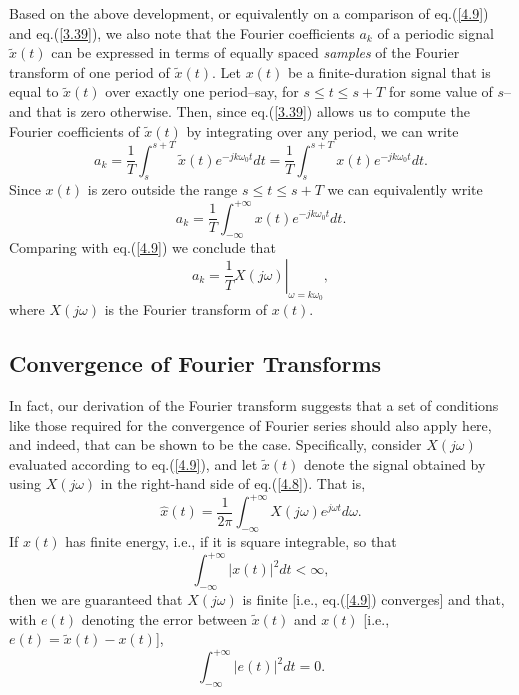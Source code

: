 \documentclass[a4paper,twoside]{book}
\begin{document}
Based on the above development, or equivalently on a comparison of eq.\;(\ref{4.9}) and eq.\;(\ref{3.39}), we also note that the Fourier coefficients $a_k$ of a periodic signal $\tilde{x}(t)$ can be expressed in terms of equally spaced \textit{samples} of the Fourier transform of one period of $\tilde{x}(t)$. Let $x(t)$ be a finite-duration signal that is equal to $\tilde{x}(t)$ over exactly one period--say, for $s\le t\le s+T$ for some value of $s$--and that is zero otherwise. Then, since eq.\;(\ref{3.39}) allows us to compute the Fourier coefficients of $\tilde{x}(t)$ by integrating over any period, we can write $$a_k = \frac1T\int_s^{s+T}\tilde{x}(t)e^{-jk\omega_0t}dt = \frac1T\int_s^{s+T}x(t)e^{-jk\omega_0t}dt.$$ Since $x(t)$ is zero outside the range $s\le t\le s+T$ we can equivalently write $$a_{k} = \frac{1}{T}\int_{-\infty}^{+\infty}x(t)e^{-jk\omega_{0}t}dt.$$ Comparing with eq.\;(\ref{4.9}) we conclude that
\begin{equation}
    a_k=\left.\frac1TX(j\omega)\right|_{\omega=k\omega_0},
    \label{4.10}
\end{equation}
where $X(j\omega)$ is the Fourier transform of $x(t)$.

\subsection{Convergence of Fourier Transforms}
\label{section:4.1.2}

In fact, our derivation of the Fourier transform suggests that a set of conditions like those required for the convergence of Fourier series should also apply here, and indeed, that can be shown to be the case. Specifically, consider $X(j\omega)$ evaluated according to eq.\;(\ref{4.9}), and let $\tilde{x}(t)$ denote the signal obtained by using $X(j\omega)$ in the right-hand side of eq.\;(\ref{4.8}). That is, $$\hat{x}(t)=\frac1{2\pi}\int_{-\infty}^{+\infty}X(j\omega)e^{j\omega t}d\omega.$$ If $x(t)$ has finite energy, i.e., if it is square integrable, so that
\begin{equation}
    \int_{-\infty}^{+\infty}|x(t)|^2dt<\infty,
    \label{4.11}
\end{equation}
then we are guaranteed that $X(j\omega)$ is finite [i.e., eq.\;(\ref{4.9}) converges] and that, with $e(t)$ denoting the error between $\tilde{x}(t)$ and $x(t)$ [i.e., $e(t)=\tilde{x}(t)-x(t)$],
\begin{equation}
    \int_{-\infty}^{+\infty}|e(t)|^2dt=0.
    \label{4.12}
\end{equation}
\end{document}
